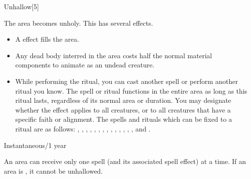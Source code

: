 \begin{spellsection}{Unhallow}[5]
    \begin{spellheader}
    \end{spellheader}
    \begin{spellcontent}
        \begin{spelltargetinginfo}
        \end{spelltargetinginfo}
        \begin{spelleffects}

            \spellline
            \spelleffect The area becomes unholy. This has several effects.
            \begin{itemize}
                \item A  effect fills the area.
                \item Any dead body interred in the area costs half the normal material components to animate as an undead creature.
                \item While performing the ritual, you can cast another spell or perform another ritual you know. The spell or ritual functions in the entire area as long as this ritual lasts, regardless of its normal area or duration. You may designate whether the effect applies to all creatures, or to all creatures that have a specific faith or alignment. The spells and rituals which can be fixed to a  ritual are as follows: , , , , , , , , , , , , , , and .
            \end{itemize}
            \spelldur Instantaneous/1 year
        \end{spelleffects}
    \end{spellcontent}
    \begin{spellfooter}
        \spellnotes An area can receive only one  spell (and its associated spell effect) at a time. If an area is , it cannot be unhallowed.
    \end{spellfooter}
\end{spellsection}

